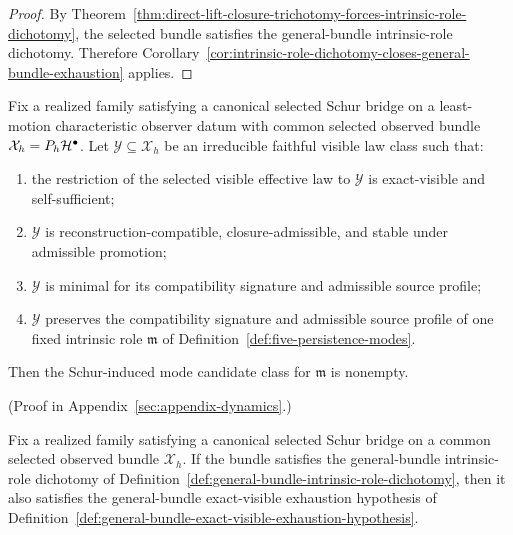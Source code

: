\begin{proof}
By
Theorem~\ref{thm:direct-lift-closure-trichotomy-forces-intrinsic-role-dichotomy},
the selected bundle satisfies the general-bundle intrinsic-role dichotomy.
Therefore
Corollary~\ref{cor:intrinsic-role-dichotomy-closes-general-bundle-exhaustion}
applies.
\end{proof}

\begin{theorem}
\label{thm:intrinsic-role-compatible-exact-visible-law-classes-are-schur-induced}
Fix a realized family satisfying a canonical selected Schur bridge on a
least-motion characteristic observer datum with common selected observed bundle
\(\mathcal X_h=P_h\mathcal{H}^\bullet\). Let \(\mathcal Y\subseteq \mathcal X_h\) be an
irreducible faithful visible law class such that:
\begin{enumerate}[label=(\roman*), leftmargin=2em, itemsep=0.2em]
\item the restriction of the selected visible effective law to \(\mathcal Y\)
      is exact-visible and self-sufficient;
\item \(\mathcal Y\) is reconstruction-compatible, closure-admissible, and
      stable under admissible promotion;
\item \(\mathcal Y\) is minimal for its compatibility signature and admissible
      source profile;
\item \(\mathcal Y\) preserves the compatibility signature and admissible
      source profile of one fixed intrinsic role \(\mathfrak m\) of
      Definition~\ref{def:five-persistence-modes}.
\end{enumerate}
Then the Schur-induced mode candidate class for \(\mathfrak m\) is nonempty.
\end{theorem}

(Proof in Appendix~\ref{sec:appendix-dynamics}.)

\begin{corollary}
\label{cor:intrinsic-role-dichotomy-forces-general-bundle-exact-visible-exhaustion-hypothesis}
Fix a realized family satisfying a canonical selected Schur bridge on a common
selected observed bundle \(\mathcal X_h\). If the bundle satisfies the
general-bundle intrinsic-role dichotomy of
Definition~\ref{def:general-bundle-intrinsic-role-dichotomy}, then it also
satisfies the general-bundle exact-visible exhaustion hypothesis of
Definition~\ref{def:general-bundle-exact-visible-exhaustion-hypothesis}.
\end{corollary}

